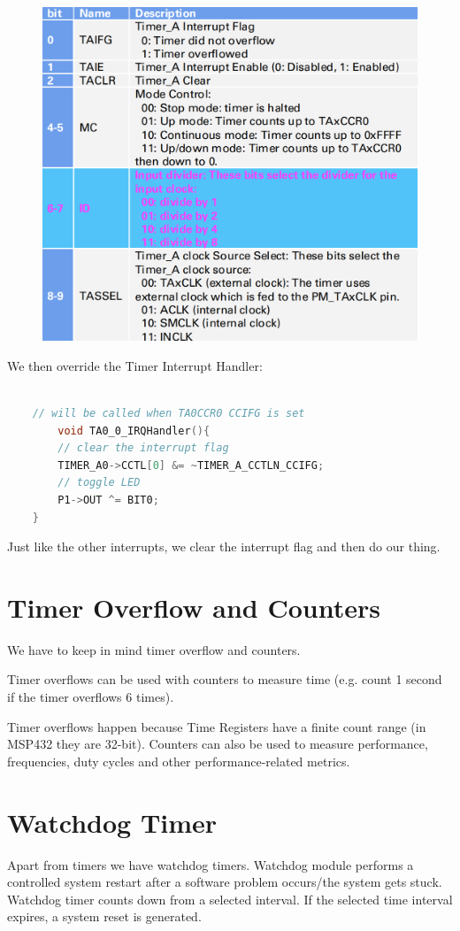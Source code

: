 \begin{figure}[H]
    \centering
    \includegraphics[width=0.6\linewidth]{img/image70.png}
\end{figure}


We then override the Timer Interrupt Handler:
\begin{lstlisting}[language=c++]

    // will be called when TA0CCR0 CCIFG is set
        void TA0_0_IRQHandler(){
        // clear the interrupt flag
        TIMER_A0->CCTL[0] &= ~TIMER_A_CCTLN_CCIFG;
        // toggle LED
        P1->OUT ^= BIT0;
    }
\end{lstlisting}

Just like the other interrupts, we clear the interrupt flag and then do our thing.

\section{Timer Overflow and Counters}
We have to keep in mind timer overflow and counters.

Timer overflows can be used with counters to measure time (e.g. count 1 second if the timer overflows 6
times).

Timer overflows happen because Time Registers have a finite count range (in MSP432 they are 32-bit).
Counters can also be used to measure performance, frequencies, duty cycles and other performance-related metrics.


\section{Watchdog Timer}

Apart from timers we have watchdog timers. Watchdog module performs a controlled system restart after
a software problem occurs/the system gets stuck.
Watchdog timer counts down from a selected interval.
If the selected time interval expires, a system reset is generated.

